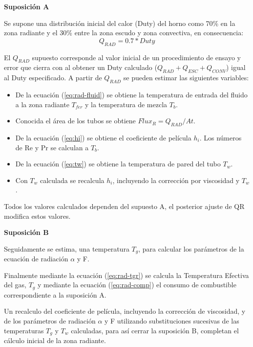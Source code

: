 \par \textbf{Suposición A}
\par Se supone una distribución inicial del calor (Duty) del horno como 70\% en la zona radiante y el 30\% entre la zona escudo y zona convectiva, en consecuencia:
\begin{equation*} Q_{RAD} = 0.7 * Duty \end{equation*}
\par El $Q_{RAD}$ supuesto corresponde al valor inicial de un procedimiento de ensayo y error que cierra con al obtener un Duty calculado ($Q_{RAD} + Q_{ESC} + Q_{CONV}$) igual al Duty especificado. A partir de $Q_{RAD}$ se pueden estimar las siguientes variables:
\begin{itemize}
\item De la ecuación (\ref{eq:rad-fluid}) se obtiene la temperatura de entrada del fluido a la zona radiante $T_{fer}$ y la temperatura de mezcla $T_b$.
\item Conocida el área de los tubos se obtiene $Flux_R = Q_{RAD} /At$.
\item De la ecuación (\ref{eq:hi}) se obtiene el coeficiente de película $h_i$. Los números de Re y Pr se calculan a $T_b$.
\item De la ecuación (\ref{eq:tw}) se obtiene la temperatura de pared del tubo $T_w$.
\item Con $T_w$ calculada se recalcula $h_i$, incluyendo la corrección por viscosidad y $T_w$.
\end{itemize}
\par Todos los valores calculados dependen del supuesto A, el  posterior ajuste de QR modifica estos valores.
\par \textbf{Suposición B}
\par Seguidamente se estima, una temperatura $T_g$, para calcular los parámetros de la ecuación de radiación $\alpha$ y F.
\par Finalmente mediante la ecuación (\ref{eq:rad-tgr}) se calcula la Temperatura Efectiva del gas, $T_g$ y mediante la ecuación (\ref{eq:rad-comp}) el consumo  de combustible correspondiente a la suposición A.
\par Un recalculo del coeficiente de película, incluyendo la corrección de viscosidad, y de los parámetros de radiación $\alpha$ y F utilizando substituciones sucesivas de las temperaturas $T_g$ y $T_w$ calculadas, para así cerrar la suposición B, completan el cálculo inicial de la zona radiante.

